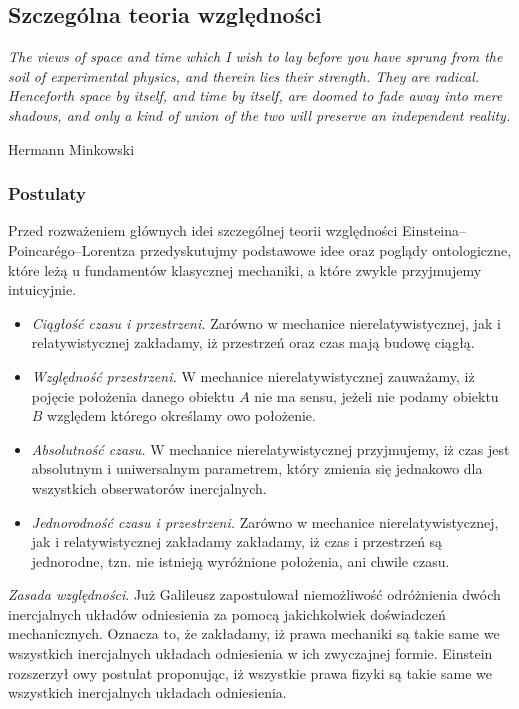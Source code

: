\documentclass[../main.tex]{subfiles}
\begin{document}
  \subsection{Szczególna teoria względności}
        \textit{The views of space and time which I wish to lay before you have sprung from the soil
        of experimental physics, and therein lies their strength. They are radical. Henceforth space
        by itself, and time by itself, are doomed to fade away into mere shadows, and only a kind of
        union of the two will preserve an independent reality.}\begin{flushright}Hermann
        Minkowski\end{flushright}

\subsubsection{Postulaty}
Przed rozważeniem głównych idei szczególnej teorii względności Einsteina--Poincarégo--Lorentza
przedyskutujmy podstawowe idee oraz poglądy ontologiczne, które leżą u fundamentów klasycznej
mechaniki, a które zwykle przyjmujemy intuicyjnie.
\begin{itemize}
    \item \textit{Ciągłość czasu i przestrzeni.} Zarówno w mechanice nierelatywistycznej, jak i
    relatywistycznej zakładamy, iż przestrzeń oraz czas mają budowę ciągłą.
    \item \textit{Względność przestrzeni.} W mechanice nierelatywistycznej zauważamy, iż pojęcie
    położenia danego obiektu \(A\) nie ma sensu, jeżeli nie podamy obiektu  \(B\) względem którego
    określamy owo położenie.
    \item \textit{Absolutność czasu.} W mechanice nierelatywistycznej przyjmujemy, iż czas jest
    absolutnym i uniwersalnym parametrem, który zmienia się jednakowo dla wszystkich obserwatorów
    inercjalnych.
    \item \textit{Jednorodność czasu i przestrzeni.} Zarówno w mechanice nierelatywistycznej, jak i
    relatywistycznej zakładamy zakładamy, iż czas i przestrzeń są jednorodne, tzn. nie istnieją
    wyróżnione położenia, ani chwile czasu.
\end{itemize}
\textit{Zasada względności}. Już Galileusz zapostulował niemożliwość odróżnienia dwóch inercjalnych
układów odniesienia za pomocą jakichkolwiek doświadczeń mechanicznych. Oznacza to, że zakładamy, iż
prawa mechaniki są takie same we wszystkich inercjalnych układach odniesienia w ich zwyczajnej
formie. Einstein rozszerzył owy postulat proponując, iż wszystkie prawa fizyki są takie same we
wszystkich inercjalnych układach odniesienia.\\
\end{document}
